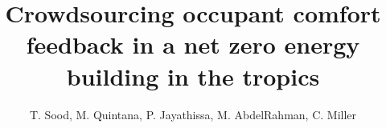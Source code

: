 \documentclass[a4paper]{jpconf} %
\begin{document}



\title{Crowdsourcing occupant comfort feedback in a net zero energy building in the tropics} 

\author{ T. Sood, M. Quintana,
P. Jayathissa, M. AbdelRahman, C. Miller}

\address{Building and Urban Data Science (BUDS) Group,  Department of Building, School of Design and Environment (SDE), National University of Singapore (NUS), Singapore}









\end{document}
